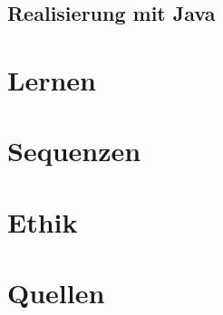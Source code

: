 \documentclass[11pt]{article}
\begin{document}
    \subsection{Realisierung mit Java}

    \section{Lernen}


    \section{Sequenzen}


    \section{Ethik}


    \section{Quellen}
\end{document}
